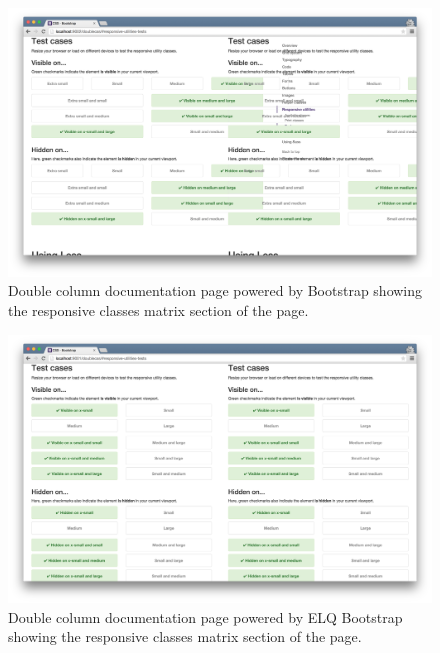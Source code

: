 \documentclass[a4paper,11pt]{kth-mag}
\begin{document}
        \begin{figure}[htbp!]
          \centering
          \includegraphics[width=0.9\linewidth]{images/bootstrap-mq-matrix}
          \caption{Double column documentation page powered by \gls{Bootstrap} showing the \gls{responsive} classes matrix section of the page.}
          \label{fig:appendix-bootstrap-mq-matrix-small}
        \end{figure}
        \begin{figure}[htbp!]
          \centering
          \includegraphics[width=0.9\linewidth]{images/bootstrap-eq-matrix}
          \caption{Double column documentation page powered by \gls{ELQ} \gls{Bootstrap} showing the \gls{responsive} classes matrix section of the page.}
          \label{fig:appendix-bootstrap-eq-matrix-small}
        \end{figure}
\end{document}
